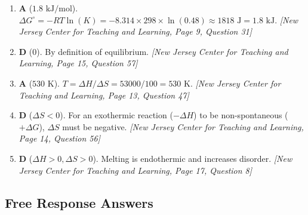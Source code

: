 \documentclass[12pt,letterpaper]{article}
\begin{document}
\begin{enumerate}
    \item \textbf{A} ($1.8\text{ kJ/mol}$). $\Delta G^\circ = -RT\ln(K) = -8.314 \times 298 \times \ln(0.48) \approx 1818\text{ J} = 1.8\text{ kJ}$. \textit{[New Jersey Center for Teaching and Learning, Page 9, Question 31]}
    
    \item \textbf{D} ($0$). By definition of equilibrium. \textit{[New Jersey Center for Teaching and Learning, Page 15, Question 57]}
    
    \item \textbf{A} ($530\text{ K}$). $T = \Delta H / \Delta S = 53000 / 100 = 530\text{ K}$. \textit{[New Jersey Center for Teaching and Learning, Page 13, Question 47]}
    
    \item \textbf{D} ($\Delta S < 0$). For an exothermic reaction ($-\Delta H$) to be non-spontaneous ($+\Delta G$), $\Delta S$ must be negative. \textit{[New Jersey Center for Teaching and Learning, Page 14, Question 56]}
    
    \item \textbf{D} ($\Delta H > 0, \Delta S > 0$). Melting is endothermic and increases disorder. \textit{[New Jersey Center for Teaching and Learning, Page 17, Question 8]}
\end{enumerate}

\subsection*{Free Response Answers}
\end{document}
